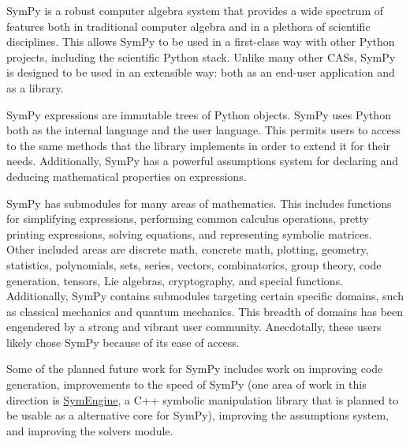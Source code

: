 SymPy is a robust computer algebra system that provides a wide spectrum of
features both in traditional computer algebra and in a plethora of scientific
disciplines. This allows SymPy to be used in a first-class way with other
Python projects, including the scientific Python stack. Unlike many other CASs, SymPy
is designed to be used in an extensible way: both as an end-user
application and as a library.

SymPy expressions are immutable trees of Python objects. SymPy uses Python both
as the internal language and the user language. This permits users to access to
the same
methods that the library implements in order to extend it for their needs.
Additionally, SymPy has a powerful assumptions
system for declaring and deducing mathematical properties on expressions.

SymPy has submodules for many areas of mathematics. This includes functions for
simplifying expressions, performing common calculus operations, pretty printing
expressions, solving equations, and representing symbolic matrices. Other included
areas
are discrete math, concrete math, plotting, geometry, statistics,
polynomials, sets, series, vectors, combinatorics, group theory, code
generation, tensors, Lie algebras, cryptography, and special functions.
Additionally, SymPy contains submodules targeting certain specific domains,
such as classical mechanics and quantum mechanics.  This breadth of domains has
been engendered by a strong and vibrant user community.
Anecdotally, these users likely chose SymPy because of its ease of access.


Some of the planned future work for SymPy includes work on improving code
generation, improvements to the speed of SymPy (one area of work in this
direction is \href{https://github.com/symengine/symengine}{SymEngine}, a
C++ symbolic manipulation library that is planned to be usable as a
alternative core for SymPy), improving the assumptions system, and improving the
solvers module.



